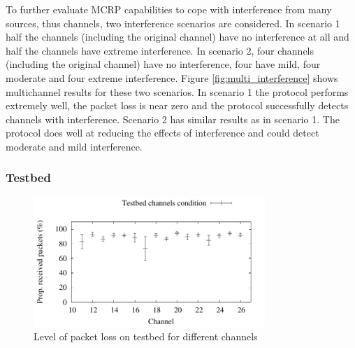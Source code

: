 


To further evaluate MCRP capabilities to cope with interference from many sources, thus channels, two interference scenarios are considered.
In scenario 1 half the channels (including the original channel) have no
interference at all and half the channels have extreme interference.
In scenario 2, four channels (including the original channel) have no
interference, four have mild, four moderate and four extreme interference.
Figure \ref{fig:multi_interference} shows multichannel results for these
two scenarios. In scenario 1 the protocol performs extremely well, the packet loss is near zero and the protocol successfully detects channels with interference.
Scenario 2 has similar results as in scenario 1. The protocol does well at reducing the effects of interference and could detect moderate and mild interference.

\subsubsection{Testbed}

\begin{figure}
\centering
\includegraphics[width=0.78\textwidth]{experiments/chCondition.pdf}
\caption{Level of packet loss on testbed for different channels}
\label{fig:chCondition_testbed}
\end{figure}

